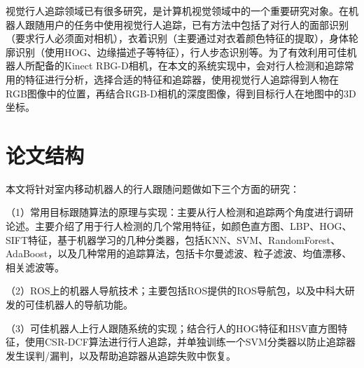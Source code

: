   视觉行人追踪领域已有很多研究，是计算机视觉领域中的一个重要研究对象。在机器人跟随用户的任务中使用视觉行人追踪，已有方法中包括了对行人的面部识别\cite{wong1995mobile,cruz2008real}（要求行人必须面对相机），衣着识别\cite{bellotto2008multimodal,noceti2009combined}（主要通过对衣着颜色特征的提取），身体轮廓识别\cite{alvarez2012feature}（使用HOG、边缘描述子等特征），行人步态识别\cite{mowbray2003automatic,koide2016identification}等。为了有效利用可佳机器人所配备的Kinect RBG-D相机，在本文的系统实现中，会对行人检测和追踪常用的特征进行分析，选择合适的特征和追踪器，使用视觉行人追踪得到人物在RGB图像中的位置，再结合RGB-D相机的深度图像，得到目标行人在地图中的3D坐标。

\section{论文结构}
  本文将针对室内移动机器人的行人跟随问题做如下三个方面的研究：

  （1）常用目标跟随算法的原理与实现：主要从行人检测和追踪两个角度进行调研论述。主要介绍了用于行人检测的几个常用特征，如颜色直方图、LBP、HOG、SIFT特征，基于机器学习的几种分类器，包括KNN、SVM、RandomForest、AdaBoost，以及几种常用的追踪算法，包括卡尔曼滤波、粒子滤波、均值漂移、相关滤波等。

  （2）ROS上的机器人导航技术；主要包括ROS提供的ROS导航包，以及中科大研发的可佳机器人的导航功能。

  （3）可佳机器人上行人跟随系统的实现；结合行人的HOG特征和HSV直方图特征，使用CSR-DCF算法进行行人追踪，并单独训练一个SVM分类器以防止追踪器发生误判/漏判，以及帮助追踪器从追踪失败中恢复。